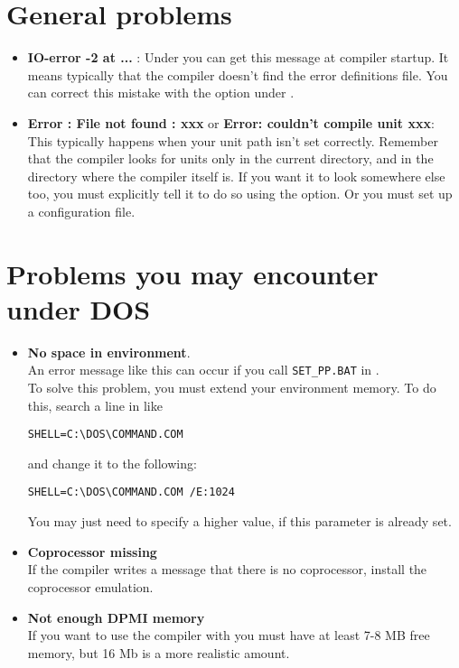 \section{General problems}
\begin{itemize}
\item \textbf{IO-error -2 at ...} : Under \linux you can get this message at
compiler startup. It means typically that the compiler doesn't find the
error definitions file. You can correct this mistake with the 
option under \linux.
\item \textbf {Error : File not found : xxx} or \textbf{Error: couldn't compile
unit xxx}: This typically happens when
your unit path isn't set correctly. Remember that the compiler looks for
units only in the current directory, and in the directory where the compiler
itself is. If you want it to look somewhere else too, you must explicitly
tell it to do so using the  option. Or you must set up a 
configuration file.
\end{itemize}

\section{Problems you may encounter under DOS}
\begin{itemize}
\item \textbf{No space in environment}.\\
An error message like this can occur if you call
\verb|SET_PP.BAT| in .\\
To solve this problem, you must extend your environment memory.
To do this, search a line in  like
\begin{verbatim}
SHELL=C:\DOS\COMMAND.COM
\end{verbatim}
and change it to the following:
\begin{verbatim}
SHELL=C:\DOS\COMMAND.COM /E:1024
\end{verbatim}
You may just need to specify a higher value, if this parameter is already set.
\item \textbf{ Coprocessor missing}\\
If the compiler writes
a message that there is no coprocessor, install
the coprocessor emulation.
\item \textbf{Not enough DPMI memory}\\
If you want to use the compiler with  you must have at least
7-8 MB free  memory, but 16 Mb is a more realistic amount.
\end{itemize}



